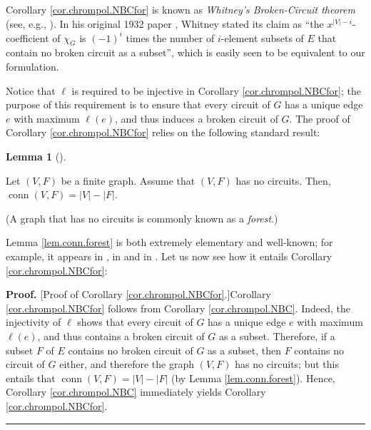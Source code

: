 \documentclass[numbers=enddot,12pt,final,onecolumn,notitlepage]{scrartcl}%
\theoremstyle{definition}
\newtheorem{lem}[theo]{Lemma}
\newenvironment{lemma}[1][]
{\begin{lem}[#1]\begin{leftbar}}
{\end{leftbar}\end{lem}}
\newenvironment{proof}[1][Proof]{\noindent\textbf{#1.} }{\ \rule{0.5em}{0.5em}}
\newenvironment{vershort}{}{}
\begin{document}
Corollary \ref{cor.chrompol.NBCfor} is known as \emph{Whitney's Broken-Circuit
theorem} (see, e.g., \cite{BlaSag86}). In his original 1932 paper
\cite[\S 7]{Whitne32}, Whitney stated its claim as \textquotedblleft the
$x^{\left\vert V\right\vert -i}$-coefficient of $\chi_{G}$ is $\left(
-1\right)  ^{i}$ times the number of $i$-element subsets of $E$ that contain
no broken circuit as a subset\textquotedblright, which is easily seen to be
equivalent to our formulation.

Notice that $\ell$ is required to be injective in Corollary
\ref{cor.chrompol.NBCfor}; the purpose of this requirement is to ensure that
every circuit of $G$ has a unique edge $e$ with maximum $\ell\left(  e\right)
$, and thus induces a broken circuit of $G$. The proof of Corollary
\ref{cor.chrompol.NBCfor} relies on the following standard result:

\begin{lemma}
\label{lem.conn.forest}Let $\left(  V,F\right)  $ be a finite graph. Assume
that $\left(  V,F\right)  $ has no circuits. Then, $\operatorname*{conn}%
\left(  V,F\right)  =\left\vert V\right\vert -\left\vert F\right\vert $.
\end{lemma}

(A graph that has no circuits is commonly known as a \emph{forest}.)

Lemma \ref{lem.conn.forest} is both extremely elementary and well-known; for
example, it appears in \cite[Proposition 10.6]{Bona17}, in \cite[\S I.2,
Corollary 6]{Bollobas} and in \cite[Theorem 6.3.15 \textbf{(e)}]{21f-lec6}.
Let us now see how it entails Corollary \ref{cor.chrompol.NBCfor}:

\begin{vershort}
\begin{proof}
[Proof of Corollary \ref{cor.chrompol.NBCfor}.]Corollary
\ref{cor.chrompol.NBCfor} follows from Corollary \ref{cor.chrompol.NBC}.
Indeed, the injectivity of $\ell$ shows that every circuit of $G$ has a unique
edge $e$ with maximum $\ell\left(  e\right)  $, and thus contains a broken
circuit of $G$ as a subset. Therefore, if a subset $F$ of $E$ contains no
broken circuit of $G$ as a subset, then $F$ contains no circuit of $G$ either,
and therefore the graph $\left(  V,F\right)  $ has no circuits; but this
entails that $\operatorname*{conn}\left(  V,F\right)  =\left\vert V\right\vert
-\left\vert F\right\vert $ (by Lemma \ref{lem.conn.forest}). Hence, Corollary
\ref{cor.chrompol.NBC} immediately yields Corollary \ref{cor.chrompol.NBCfor}.
\end{proof}
\end{vershort}
\end{document}
